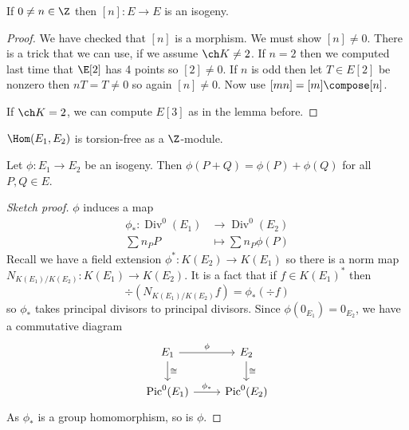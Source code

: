 \documentclass[a4paper]{article}
\theoremstyle{definition}
\theoremstyle{theorem}
\DeclareMathOperator{\Div}{Div} %
\DeclareMathOperator{\Pic}{Pic} %
\begin{document}
\begin{lemma}
  If \(0 \neq n \in \Z\) then \([n]: E \to E\) is an isogeny.
\end{lemma}

\begin{proof}
  We have checked that \([n]\) is a morphism. We must show \([n] \neq 0\). There is a trick that we can use, if we assume \(\ch K \neq 2\). If \(n = 2\) then we computed last time that \(\E[2]\) has 4 points so \([2] \neq 0\). If \(n\) is odd then let \(T \in E[2]\) be nonzero then \(nT = T \neq 0\) so again \([n] \neq 0\). Now use \([mn] = [m] \compose [n]\).

  If \(\ch K = 2\), we can compute \(E[3]\) as in the lemma before.
\end{proof}

\begin{corollary}
  \(\Hom(E_1, E_2)\) is torsion-free as a \(\Z\)-module.
\end{corollary}

\begin{lemma}
  Let \(\phi: E_1 \to E_2\) be an isogeny. Then \(\phi(P + Q) = \phi(P) + \phi(Q)\) for all \(P, Q \in E\).
\end{lemma}

\begin{proof}[Sketch proof]
  \(\phi\) induces a map
  \begin{align*}
    \phi_*: \Div^0(E_1) &\to \Div^0(E_2) \\
    \sum n_P P &\mapsto \sum n_P \phi(P)
  \end{align*}
  Recall we have a field extension \(\phi^*: K(E_2) \to K(E_1)\) so there is a norm map \(N_{K(E_1)/K(E_2)}: K(E_1) \to K(E_2)\). It is a fact that if \(f \in K(E_1)^*\) then
  \[
    \div (N_{K(E_1)/K(E_2)} f) = \phi_*(\div f)
  \]
  so \(\phi_*\) takes principal divisors to principal divisors. Since \(\phi(0_{E_1}) = 0_{E_2}\), we have a commutative diagram
  \[
    \begin{tikzcd}
      E_1 \ar[r, "\phi"] \ar[d, "\cong"] & E_2 \ar[d, "\cong"] \\
      \Pic^0(E_1) \ar[r, "\phi_*"] & \Pic^0(E_2)
    \end{tikzcd}
  \]
  As \(\phi_*\) is a group homomorphism, so is \(\phi\).
\end{proof}
\end{document}
